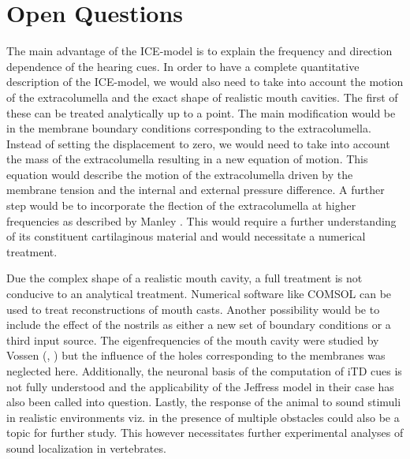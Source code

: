\section{Open Questions}
The main advantage of the ICE-model is to explain the frequency and direction dependence of the
hearing cues. In order to have a complete quantitative description of the ICE-model, we would also need to take
into account the motion of the extracolumella and the exact shape of realistic mouth cavities. The first of
these can be treated analytically up to a point. The main modification would be in the membrane boundary
conditions corresponding to the extracolumella. Instead of setting the displacement to zero, we would need to take into
account the mass of the extracolumella resulting in a new equation of motion. This equation would describe the motion
of the extracolumella driven by the membrane tension and the internal and external pressure difference. A further step
would be to incorporate the flection of the extracolumella at higher frequencies as described by Manley \cite{manleygecko1}. This would require a further 
understanding of its constituent cartilaginous material and would necessitate a numerical treatment.

Due the complex shape of a realistic mouth cavity, a full treatment is not conducive to an analytical treatment.
Numerical software like COMSOL can be used to treat reconstructions of mouth casts. Another possibility
would be to include the effect of the nostrils as either a new set of boundary conditions or a third input source. The eigenfrequencies
of the mouth cavity were studied by Vossen (\cite[p.~39]{vossenthesis}, \cite{vossenjasa}) but the influence of the holes corresponding to the membranes was neglected here. Additionally,
the neuronal basis of the computation of iTD cues is not fully understood and the applicability of the Jeffress model in their
case has also been called into question. Lastly, the response of the animal to sound stimuli in realistic environments viz. in the presence
of multiple obstacles could also be a topic for further study. This however necessitates further experimental analyses of sound localization in
vertebrates.